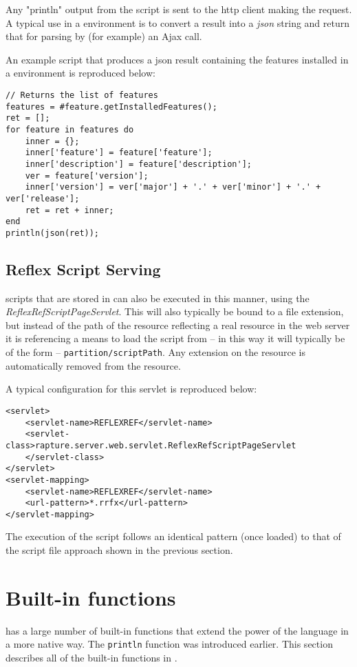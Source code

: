 Any "println" output from the script is sent to the http client making the request. A typical use in a \Rapture environment is to convert a result into a \emph{json} string and return that for parsing by (for example) an Ajax call.

An example script that produces a json result containing the features installed in a \Rapture environment is reproduced below:

\begin{lstlisting}[caption={Reflex Page Script Example}]
// Returns the list of features
features = #feature.getInstalledFeatures();
ret = [];
for feature in features do
    inner = {};
    inner['feature'] = feature['feature'];
    inner['description'] = feature['description'];
    ver = feature['version'];
    inner['version'] = ver['major'] + '.' + ver['minor'] + '.' + ver['release'];
    ret = ret + inner;
end
println(json(ret));
\end{lstlisting}

\section{Reflex Script Serving}
\Reflex scripts that are stored in \Rapture can also be executed in this manner, using the \emph{ReflexRefScriptPageServlet}. This will also typically be bound to a file extension, but instead of the path of the resource reflecting a real resource in the web server it is referencing a means to load the script from \Rapture -- in this way it will typically be of the form -- \Verb+partition/scriptPath+. Any extension on the resource is automatically removed from the resource.

A typical configuration for this servlet is reproduced below:

\begin{Verbatim}
<servlet>
    <servlet-name>REFLEXREF</servlet-name>
    <servlet-class>rapture.server.web.servlet.ReflexRefScriptPageServlet
    </servlet-class>
</servlet>
<servlet-mapping>
    <servlet-name>REFLEXREF</servlet-name>
    <url-pattern>*.rrfx</url-pattern>
</servlet-mapping>
\end{Verbatim}

The execution of the script follows an identical pattern (once loaded) to that of the script file approach shown in the previous section.

\chapter{Built-in functions}
\Reflex has a large number of built-in functions that extend the power of the language in a more native way. The \Verb+println+ function was introduced earlier. This section describes all of the built-in functions in \Reflex.


